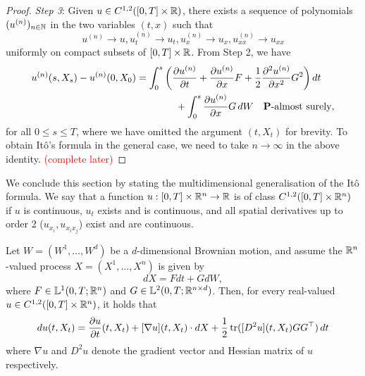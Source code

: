 \begin{proof}
    \emph{Step 3}: Given $u\in C^{1,2}([0,T]\times\mathbb{R})$, there exists a sequence of polynomials $(u^{(n)})_{n\in\mathbb{N}}$ in the two variables $(t,x)$ such that
    \begin{equation*}
        u^{(n)}\to u, u_t^{(n)}\to u_t, u_x^{(n)}\to u_x, u_{xx}^{(n)}\to u_{xx}
    \end{equation*}
    uniformly on compact subsets of $[0,T]\times\mathbb{R}$. From Step 2, we have
    \begin{align*}
        u^{(n)}(s,X_s) - u^{(n)}(0,X_0) &= \int_0^s \left(\frac{\partial u^{(n)}}{\partial t} + \frac{\partial u^{(n)}}{\partial x}F + \frac{1}{2}\frac{\partial^2 u^{(n)}}{\partial x^2}G^2\right) dt\\
        &\qquad\qquad +\int_0^s \frac{\partial u^{(n)}}{\partial x} G\,dW \quad\text{$\mathbf{P}$-almost surely},
    \end{align*}
    for all $0\le s\le T$, where we have omitted the argument $(t,X_t)$ for brevity. To obtain It\^{o}'s formula in the general case, we need to take $n\to\infty$ in the above identity. \textcolor{red}{(complete later)}
\end{proof}

We conclude this section by stating the multidimensional generalisation of the It\^{o} formula. We say that a function $u:[0,T]\times\mathbb{R}^n\to\mathbb{R}$ is of class $C^{1,2}([0,T]\times\mathbb{R}^n)$ if $u$ is continuous, $u_t$ exists and is continuous, and all spatial derivatives up to order 2 ($u_{x_i}, u_{x_i x_j}$) exist and are continuous.

\begin{theorem}
    Let $W=(W^1,\ldots,W^d)$ be a $d$-dimensional Brownian motion, and assume the $\mathbb{R}^n$-valued process $X=(X^1,\ldots,X^n)$ is given by
    \begin{equation*}
        dX = Fdt + GdW,
    \end{equation*}
    where $F\in\mathbb{L}^1(0,T;\mathbb{R}^n)$ and $G\in\mathbb{L}^2(0,T;\mathbb{R}^{n\times d})$. Then, for every real-valued $u\in C^{1,2}([0,T]\times\mathbb{R}^n)$, it holds that
    \begin{equation}
    \label{eq:multidim-ito}
        du(t,X_t) = \frac{\partial u}{\partial t}(t,X_t) + [\nabla u](t,X_t)\cdot dX + \frac{1}{2}\operatorname{tr}([D^2u](t,X_t)GG^\top)\,dt
    \end{equation}
    where $\nabla u$ and $D^2 u$ denote the gradient vector and Hessian matrix of $u$ respectively.
\end{theorem}

